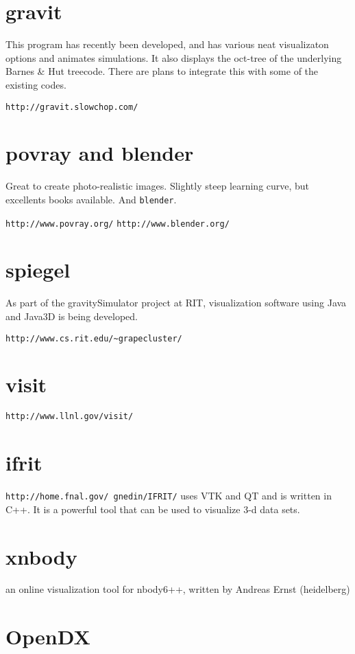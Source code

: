 \section{gravit}

This program has recently been developed, and has various neat visualizaton
options and animates simulations. It also displays the oct-tree of the
underlying Barnes \& Hut treecode. There are plans to integrate this with
some of the existing codes.

{\tt http://gravit.slowchop.com/}

\section{povray and blender}

Great to create photo-realistic images. Slightly steep learning curve, but
excellents books available. And {\tt blender}.

{\tt http://www.povray.org/}
{\tt http://www.blender.org/}

\section{spiegel}

As part of the gravitySimulator project at RIT, visualization software using Java
and Java3D is being developed.

\verb+http://www.cs.rit.edu/~grapecluster/+

\section{visit}

{\tt http://www.llnl.gov/visit/}

\section{ifrit}

{\tt http://home.fnal.gov/~gnedin/IFRIT/}
uses VTK and QT and is
written in C++. It is a powerful
tool that can be used to visualize 3-d data sets.

\section{xnbody}

an online visualization tool for nbody6++, written by
Andreas Ernst (heidelberg)

\section{OpenDX}

